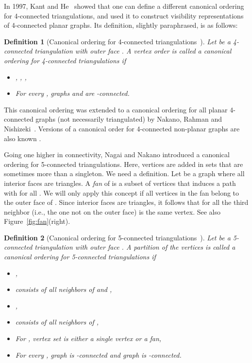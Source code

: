 \documentclass[12pt]{article}
\newtheorem{definition}{Definition}
\begin{document}
In 1997, Kant and He~\cite{KH97} showed that one can define a different canonical ordering for 4-connected triangulations, and used it to construct visibility representations of 4-connected planar graphs. 
Its definition, slightly paraphrased, is as follows:

\begin{definition}[Canonical ordering for 4-connected triangulations~\cite{KH97}]
\label{def:22-ordering}
Let  be a 4-connected triangulation with outer face . A vertex order
 is called a \emph{canonical ordering for 4-connected triangulations} if 
\begin{itemize}
\item , , ,
\item For every , graphs  and  are -connected. 
\end{itemize}
\end{definition}

This canonical ordering was extended to a canonical ordering for all planar 4-connected graphs (not necessarily triangulated) by Nakano, Rahman and Nishizeki~\cite{NRN97}. 
Versions of a canonical order for 4-connected non-planar graphs are also known \cite{CLY05}.

Going one higher in connectivity,
Nagai and Nakano \cite{NN00} introduced a canonical ordering
for 5-connected triangulations.  Here, vertices are added in sets that
are sometimes more than a singleton.  We need a definition.
Let  be a graph where all interior faces are triangles.  A {\em fan} 
of  is a subset of
vertices  that induces a path with
 for all .  We will only apply this
concept if all vertices in the fan belong to the outer face of .
Since interior faces are triangles, it follows that for all 
the third neighbor (i.e., the one not on the outer face) is the
same vertex.   See also Figure~\ref{fig:fan}(right).

\begin{definition}[Canonical ordering for 5-connected triangulations~\cite{NN00}]
Let  be a 5-connected triangulation with outer face . A partition of the vertices  is called a \emph{canonical ordering for 5-connected triangulations} if 
\begin{itemize}
\item ,
\item  consists of all neighbors of  and ,
\item ,
\item  consists of all neighbors of ,
\item For , vertex set  is either a single vertex or a fan,
\item For every , graph  is -connected and
graph  is -connected. 
\end{itemize}
\end{definition}
\end{document}
